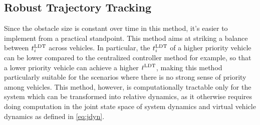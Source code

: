 \subsection{Robust Trajectory Tracking}
Since the obstacle size is constant over time in this method, it's easier to implement from a practical standpoint. This method aims at striking a balance between $t^\text{LDT}_i$ across vehicles. In particular, the $t^\text{LDT}_i$ of a higher priority vehicle can be lower compared to the centralized controller method for example, so that a lower priority vehicle can achieve a higher $t^\text{LDT}$, making this method particularly suitable for the scenarios where there is no strong sense of priority among vehicles. This method, however, is computationally tractable only for the system which can be transformed into relative dynamics, as it otherwise requires doing computation in the joint state space of system dynamics and virtual vehicle dynamics as defined in \eqref{eq:jdyn}. 